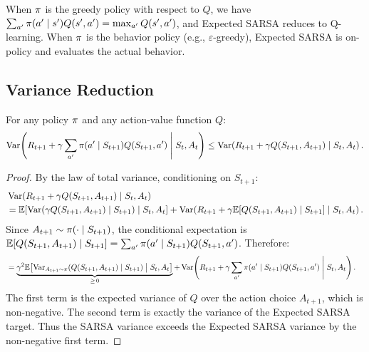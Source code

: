 \documentclass[11pt,a4paper]{article}
\begin{document}
\begin{remark}
\label{rem:esarsa_qlearning}
When $\pi$ is the greedy policy with respect to $Q$, we have
$\sum_{a'} \pi(a' \mid s') Q(s',a') = \max_{a'} Q(s',a')$,
and Expected SARSA reduces to Q-learning. When $\pi$ is the
behavior policy (e.g., $\varepsilon$-greedy), Expected SARSA
is on-policy and evaluates the actual behavior.
\end{remark}

\subsection{Variance Reduction}
\label{subsec:esarsa_variance}

\begin{keyresult}[title={Expected SARSA Has Lower Variance Than SARSA}]
\begin{proposition}
\label{prop:esarsa_variance}
For any policy $\pi$ and any action-value function $Q$:
\begin{equation}
  \operatorname{Var}\!\left(R_{t+1} + \gamma \sum_{a'} \pi(a' \mid S_{t+1})
    Q(S_{t+1}, a') \;\middle|\; S_t, A_t\right)
  \leq \operatorname{Var}\!\left(R_{t+1} + \gamma Q(S_{t+1}, A_{t+1})
    \;\middle|\; S_t, A_t\right).
  \label{eq:esarsa_variance}
\end{equation}
\end{proposition}
\end{keyresult}

\begin{proof}
By the law of total variance, conditioning on $S_{t+1}$:
\begin{align}
  &\operatorname{Var}\!\left(R_{t+1} + \gamma Q(S_{t+1}, A_{t+1})
    \;\middle|\; S_t, A_t\right) \nonumber\\
  &= \mathbb{E}\!\left[\operatorname{Var}\!\left(\gamma Q(S_{t+1}, A_{t+1})
    \;\middle|\; S_{t+1}\right) \;\middle|\; S_t, A_t\right]
  + \operatorname{Var}\!\left(R_{t+1} + \gamma \mathbb{E}[Q(S_{t+1}, A_{t+1})
    \mid S_{t+1}] \;\middle|\; S_t, A_t\right).
  \label{eq:esarsa_var_step1}
\end{align}
Since $A_{t+1} \sim \pi(\cdot \mid S_{t+1})$, the conditional
expectation is
$\mathbb{E}[Q(S_{t+1}, A_{t+1}) \mid S_{t+1}]
= \sum_{a'} \pi(a' \mid S_{t+1}) Q(S_{t+1}, a')$.
Therefore:
\begin{align}
  &= \underbrace{\gamma^2
    \mathbb{E}\!\left[\operatorname{Var}_{A_{t+1} \sim \pi}\!\left(Q(S_{t+1}, A_{t+1})
    \;\middle|\; S_{t+1}\right) \;\middle|\; S_t, A_t\right]
  }_{\geq\, 0}
  + \operatorname{Var}\!\left(R_{t+1} + \gamma \sum_{a'} \pi(a' \mid
    S_{t+1}) Q(S_{t+1}, a') \;\middle|\; S_t, A_t\right).
  \label{eq:esarsa_var_step2}
\end{align}
The first term is the expected variance of $Q$ over the action
choice $A_{t+1}$, which is non-negative. The second term is exactly
the variance of the Expected SARSA target. Thus the SARSA variance
exceeds the Expected SARSA variance by the non-negative first term.
\end{proof}
\end{document}
